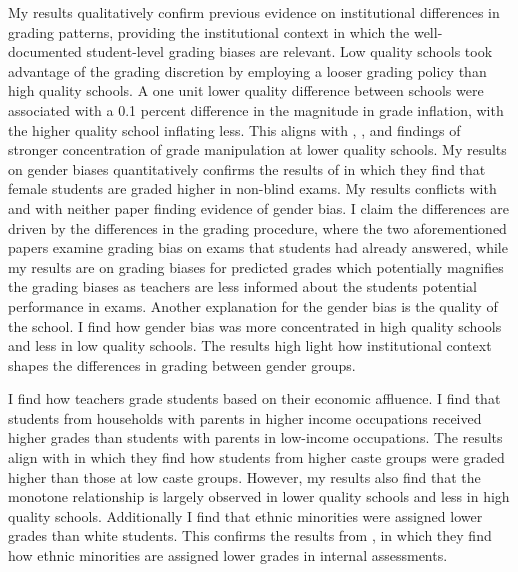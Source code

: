 My results qualitatively confirm previous evidence on institutional differences in grading patterns, providing the institutional context in which the well-documented student-level grading biases are relevant. Low quality schools took advantage of the grading discretion by employing a looser grading policy than high quality schools. A one unit lower quality difference between schools were associated with a 0.1 percent difference in the magnitude in grade inflation, with the higher quality school inflating less. This aligns with \cite{figlio2004}, \cite{10.1162/00335530360698441}, and \cite{dee2019} findings of stronger concentration of grade manipulation at lower quality schools. My results on gender biases quantitatively confirms the results of \cite{lavy2018} in which they find that female students are graded higher in non-blind exams. My results conflicts with \cite{hanna2012} and \cite{diamond} with neither paper finding evidence of gender bias. I claim the differences are driven by the differences in the grading procedure, where the two aforementioned papers examine grading bias on exams that students had already answered, while my results are on grading biases for predicted grades which potentially magnifies the grading biases as teachers are less informed about the students potential performance in exams.  Another explanation for the gender bias is the quality of the school. I find how gender bias was more concentrated in high quality schools and less in low quality schools. The results high light how institutional context shapes the differences in grading between gender groups.

I find how teachers grade students based on their economic affluence. I find that students from households with parents in higher income occupations received higher grades than students with parents in low-income occupations. The results align with \cite{hanna2012} in which they find how students from higher caste groups were graded higher than those at low caste groups. However, my results also find that the monotone relationship is largely observed in lower quality schools and less in high quality schools. Additionally I find that ethnic minorities were assigned lower grades than white students. This confirms the results from \cite{burgess2013}, in which they find how ethnic minorities are assigned lower grades in internal assessments.  

